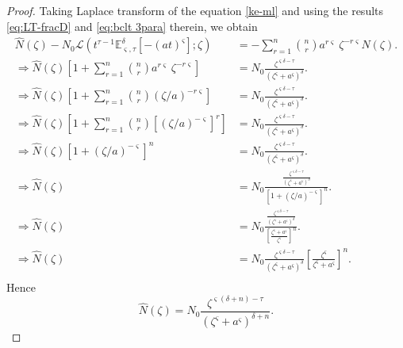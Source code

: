 \documentclass[a4paper,12pt]{article}
\theoremstyle{remark}
\begin{document}
\begin{proof} Taking Laplace transform of the equation \eqref{ke-ml} and using the results \eqref{eq:LT-fracD} and \eqref{eq:bclt 3para} therein, we obtain
\begin{equation}
\begin{split}
\hat { N}(\zeta)-N_0 \mathcal{L}\left( t^{\tau -1}\mathbb{E}_{ \varsigma,\tau}^\delta[-(a t)^{ \varsigma}];\zeta\right) &=-\sum_{r=1}^{n}\binom{n}{r} {a}^{r \varsigma}~ \zeta^{-r \varsigma} \hat { N}(\zeta).\\
\Rightarrow \hat { N}(\zeta)\left[ 1+\sum_{r=1}^{n}\binom{n}{r} {a}^{r \varsigma}~ \zeta^{-r \varsigma}\right]& =N_0 \frac{\zeta^{ \varsigma\delta-\tau}}{(\zeta^{ \varsigma}+a^ \varsigma)^\delta}.\\
\Rightarrow \hat { N}(\zeta)\left[ 1+\sum_{r=1}^{n}\binom{n}{r} (\zeta/a)^{-r \varsigma}\right]& =N_0 \frac{\zeta^{ \varsigma\delta-\tau}}{(\zeta^{ \varsigma}+a^ \varsigma)^\delta}.\\
\Rightarrow \hat { N}(\zeta)\left[ 1+\sum_{r=1}^{n}\binom{n}{r}[ (\zeta/a)^{- \varsigma}]^r\right]& =N_0 \frac{\zeta^{ \varsigma\delta-\tau}}{(\zeta^{ \varsigma}+a^ \varsigma)^\delta}.\\
\Rightarrow \hat { N}(\zeta)\left[ 1+ (\zeta/a)^{- \varsigma}\right]^n& =N_0 \frac{\zeta^{ \varsigma\delta-\tau}}{(\zeta^{ \varsigma}+a^ \varsigma)^\delta}.\\
\Rightarrow \hat { N}(\zeta)& =N_0 \frac{\frac{\zeta^{ \varsigma\delta-\tau}}{(\zeta^{ \varsigma}+a^ \varsigma)^\delta}}{\left[ 1+ (\zeta/a)^{- \varsigma}\right]^n}.\\
\Rightarrow \hat { N}(\zeta)& =N_0 \frac{\frac{\zeta^{ \varsigma\delta-\tau}}{(\zeta^{ \varsigma}+a^ \varsigma)^\delta}}{\left[ \frac{\zeta^ \varsigma+ a^{ \varsigma}}{\zeta^ \varsigma}\right]^n}.\\
\Rightarrow \hat { N}(\zeta)& =N_0 \frac{\zeta^{ \varsigma\delta-\tau}}{(\zeta^{ \varsigma}+a^ \varsigma)^\delta}{\left[ \frac{\zeta^ \varsigma}{\zeta^ \varsigma+ a^{ \varsigma}}\right]^n}.\\
\end{split}
\end{equation}
Hence
\begin{equation}\label{eq:invlap}
    \hat { N}(\zeta) =N_0 \frac{\zeta^{ \varsigma(\delta+n)-\tau}}{(\zeta^{ \varsigma}+a^ \varsigma)^{\delta+n}}.

\end{equation}
\end{proof}
\end{document}
